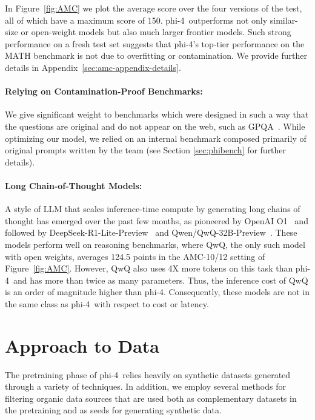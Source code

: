 \documentclass[11pt]{article}
\newcommand{\modelwithoutspace}{\textsf{phi-4}}
\newcommand{\model}{\modelwithoutspace~}
\begin{document}
In Figure~\ref{fig:AMC} we plot the average score over the four versions of the test, all of which have a maximum score of 150.  \model outperforms not only similar-size or open-weight models but also much larger frontier models. Such strong performance on a fresh test set suggests that \modelwithoutspace's top-tier performance on the MATH benchmark is not due to overfitting or contamination. We provide further details in Appendix~\ref{sec:amc-appendix-details}.



\paragraph{Relying on Contamination-Proof Benchmarks:}
We give significant weight to benchmarks which were designed in such a way that the questions are original and do not appear on the web, such as GPQA~\cite{rein2023gpqa}. While optimizing our model, we relied on an internal benchmark composed primarily of original prompts written by the team (see Section \ref{sec:phibench} for further details).

\paragraph{Long Chain-of-Thought Models:}
A style of LLM that scales inference-time compute by generating long chains of thought has emerged over the past few months, as pioneered by OpenAI O1~\cite{openai_learning_to_reason} and followed by DeepSeek-R1-Lite-Preview~\cite{deepseek_r1_lite_preview} and Qwen/QwQ-32B-Preview~\cite{qwq-32b-preview}.  These models perform well on reasoning benchmarks, where QwQ, the only such model with open weights, averages 124.5 points in the AMC-10/12 setting of Figure~\ref{fig:AMC}.  However, QwQ also uses 4X more tokens on this task than \model and has more than twice as many parameters.  Thus, the inference cost of QwQ is an order of magnitude higher than \modelwithoutspace.  Consequently, these models are not in the same class as \model with respect to cost or latency.

\section{Approach to Data}
The pretraining phase of \model relies heavily on synthetic datasets generated through a variety of techniques. In addition, we employ several methods for filtering organic data sources that are used both as complementary datasets in the pretraining and as seeds for generating synthetic data.
\end{document}
